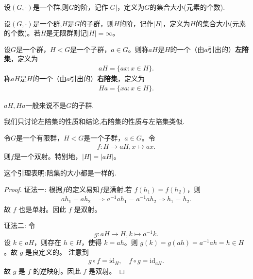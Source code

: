 \documentclass[../../main.tex]{subfiles}
\begin{document}
\begin{definition}[群的阶]
设$(G,\cdot)$是一个群,则$G$的阶，记作$|G|$，定义为$G$的集合大小(元素的个数).
\end{definition}

\begin{definition}[子群的阶]
设$(G,\cdot)$是一个群,$H$是$G$的子群，则$H$的阶，记作$|H|$，定义为$H$的集合大小(元素的个数)。若$H$是无限群则记$|H| = \infty$。
\end{definition}

\begin{definition}[左陪集]
设$G$是一个群，$H < G$是一个子群，$a \in G$。则称$aH$是$H$的一个（由$a$引出的）\textbf{左陪集}，定义为
\begin{align*}
aH = \{ax : x \in H\}.
\end{align*}
称$aH$是$H$的一个（由$a$引出的）\textbf{右陪集}，定义为
\begin{align*}
Ha = \{xa : x \in H\}.
\end{align*} 
\end{definition}
\begin{remark}
$aH,Ha$一般来说不是$G$的子群.

我们只讨论左陪集的性质和结论,右陪集的性质与左陪集类似.
\end{remark}

\begin{lemma}\label{lemma:陪集aH大小与H相同}
令$G$是一个有限群，$H < G$是一个子群，$a \in G$。令
\begin{align*}
f : H \to aH,x \mapsto ax.
\end{align*}
则$f$是一个双射。特别地，$|H| = |aH|$。 
\end{lemma}
\begin{note}
这个引理表明:陪集的大小都是一样的.
\end{note}
\begin{proof}
{\color{blue}证法一:}
根据$f$的定义易知$f$是满射.若 \(f(h_1) = f(h_2)\)，则
\begin{align*}
ah_1 = ah_2 &\Rightarrow a^{-1}ah_1 = a^{-1}ah_2 \Rightarrow h_1 = h_2.
\end{align*}
故 \(f\) 也是单射。因此 \(f\) 是双射。

{\color{blue}证法二:}
令
\[g: aH \rightarrow H, k \mapsto a^{-1}k.\]
设 \(k \in aH\)，则存在 \(h \in H\)，使得 \(k = ah\)。则 \(g(k) = g(ah) = a^{-1}ah = h \in H\)。故 \(g\) 是良定义的。
注意到
\begin{align*}
g \circ f = \mathrm{id}_H, \quad f \circ g = \mathrm{id}_{aH}.
\end{align*}
故 \(g\) 是 \(f\) 的逆映射。因此 \(f\) 是双射。 
\end{proof}
\end{document}

